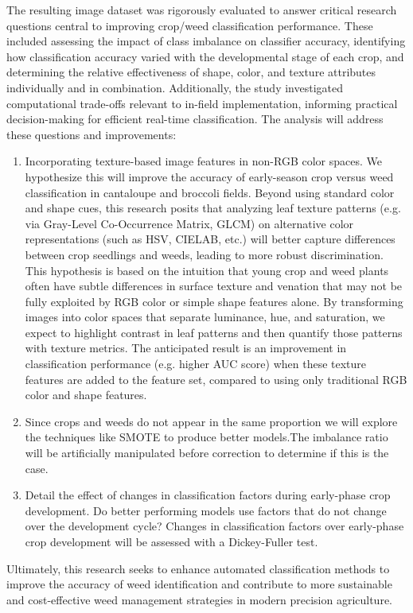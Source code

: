 \documentclass[letterpaper]{report}
\begin{document}
The resulting image dataset was rigorously evaluated to answer critical research questions central to improving crop/weed classification performance. These included assessing the impact of class imbalance on classifier accuracy, identifying how classification accuracy varied with the developmental stage of each crop, and determining the relative effectiveness of shape, color, and texture attributes individually and in combination. Additionally, the study investigated computational trade-offs relevant to in-field implementation, informing practical decision-making for efficient real-time classification. The analysis will address these questions and improvements:
\begin{enumerate}
	\item{Incorporating texture-based image features in non-RGB color spaces. We hypothesize this will improve the accuracy of early-season crop versus weed classification in cantaloupe and broccoli fields. Beyond using standard color and shape cues, this research posits that analyzing leaf texture patterns (e.g. via Gray-Level Co-Occurrence Matrix, GLCM) on alternative color representations (such as HSV, CIELAB, etc.) will better capture differences between crop seedlings and weeds, leading to more robust discrimination. This hypothesis is based on the intuition that young crop and weed plants often have subtle differences in surface texture and venation that may not be fully exploited by RGB color or simple shape features alone. By transforming images into color spaces that separate luminance, hue, and saturation, we expect to highlight contrast in leaf patterns and then quantify those patterns with texture metrics. The anticipated result is an improvement in classification performance (e.g. higher AUC score) when these texture features are added to the feature set, compared to using only traditional RGB color and shape features.}
	\item{Since crops and weeds do not appear in the same proportion we will explore the techniques like SMOTE to produce better models.The imbalance ratio will be artificially manipulated before correction to determine if this is the case.}
	\item{Detail the effect of changes in classification factors during early-phase crop development. Do better performing models use factors that do not change over the development cycle? Changes in classification factors over early-phase crop development will be assessed with a Dickey-Fuller test.}
\end{enumerate}
Ultimately, this research seeks to enhance automated classification methods to improve the accuracy of weed identification and contribute to more sustainable and cost-effective weed management strategies in modern precision agriculture.
\end{document}
